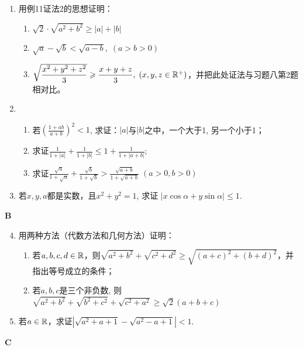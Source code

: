 \begin{enumerate}
    \item 用例11证法2的思想证明：
\begin{enumerate}[(1)]
    \item $\sqrt{2}\cdot \sqrt{a^2+b^2}\ge |a|+|b|$
    \item $\sqrt{a}-\sqrt{b}<\sqrt{a-b},\; (a>b>0)$
    \item $\sqrt{\dfrac{x^2+y^2+z^2}{3}}\geqslant \dfrac{x+y+z}{3},\; (x,y,z\in\mathbb{R}^+)$，并把此处证法与习题八第2题相对比。
\end{enumerate}

\item \begin{enumerate}[(1)]
    \item 若$\left(\frac{1+ab}{a+b}\right)^2<1$, 求证：$|a|$与$|b|$之中，一个大于1, 另一个小于1；
    \item 求证$\frac{1}{1+|a|}+\frac{1}{1+|b|}\leqslant1+\frac{1}{1+|a+b|}$;
    \item 求证$\frac{\sqrt{a}}{1+\sqrt{a}}+\frac{\sqrt{b}}{1+\sqrt{b}}>\frac{\sqrt{a+b}}{1+\sqrt{a+b}}\; (a>0,b>0)$
\end{enumerate}

\item 若$x,y,a$都是实数，且$x^2+y^2=1$, 求证
$|x\cos\alpha+y\sin\alpha|\leqslant1$.
\end{enumerate}

\begin{center}
    \bfseries B
\end{center}
\begin{enumerate}\setcounter{enumi}{3}
    \item 用两种方法（代数方法和几何方法）证明：
\begin{enumerate}[(1)]
    \item 若$a,b,c,d\in \mathbb{R}$，则$\sqrt{a^{2}+b^{2}}+\sqrt{c^{2}+d^{2}}\geq\sqrt{(a+c)^{2}+(b+d)^{2}}$，并指出等号成立的条件；
    \item 若$a,b,c$是三个非负数, 则$\sqrt{a^{2}+b^{2}}+\sqrt{b^{2}+c^{2}}+\sqrt{c^{2}+a^{2}}\geqslant\sqrt{2}(a+b+c)$
\end{enumerate}
    
\item 若$a\in\mathbb{R}$，求证$|\sqrt{a^{2}+a+1}-\sqrt{a^{2}-a+1}|<1$.
\end{enumerate}

\begin{center}
    \bfseries C
\end{center}

